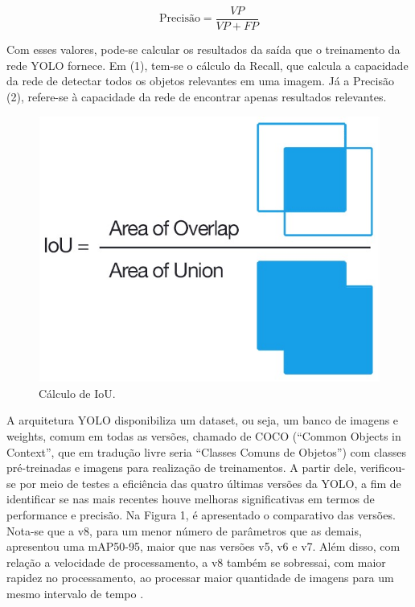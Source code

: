     \begin{equation}
    \text{Precisão} = \frac{VP}{VP + FP} \tag{2}
\end{equation}

Com esses valores, pode-se calcular os resultados da saída que o treinamento da rede YOLO fornece. Em (1), tem-se o cálculo da Recall, que calcula a capacidade da rede de detectar todos os objetos relevantes em uma imagem. Já a Precisão (2), refere-se à capacidade da rede de encontrar apenas resultados relevantes. 

\begin{figure}[!h]
    \center
    \begin{minipage}{0.6\linewidth}
    \center
    \captionsetup{justification=centering,margin=0.5cm,font=small}
    \includegraphics[width=0.7\linewidth]{img/cap2/iou.png}
    \caption{ Cálculo de IoU. \cite{padilla2020survey}} \label{subfig:iou}
    \end{minipage}
\end{figure}

A arquitetura YOLO disponibiliza um dataset, ou seja, um banco de imagens e weights, comum em todas as versões, chamado de COCO (“Common Objects in Context”, que em tradução livre seria “Classes Comuns de Objetos”) com classes pré-treinadas e imagens para realização de treinamentos. A partir dele, verificou-se por meio de testes a eficiência das quatro últimas versões da YOLO, a fim de identificar se nas mais recentes houve melhoras significativas em termos de performance e precisão. Na Figura 1, é apresentado o comparativo das versões. Nota-se que a v8, para um menor número de parâmetros que as demais, apresentou uma mAP50-95, maior que nas versões v5, v6 e v7. Além disso, com relação a velocidade de processamento, a v8 também se sobressai, com maior rapidez no processamento, ao processar maior quantidade de imagens para um mesmo intervalo de tempo \cite{padilla2020survey}.

